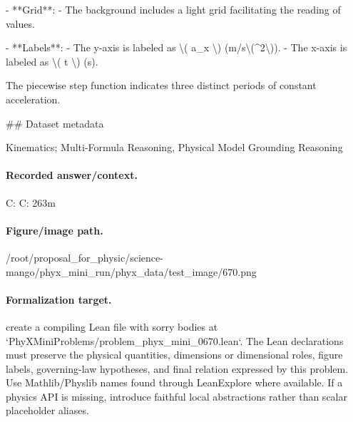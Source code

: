 - **Grid**: 
  - The background includes a light grid facilitating the reading of values.

- **Labels**: 
  - The y-axis is labeled as \textbackslash{}( a\_x \textbackslash{}) (m/s\textbackslash{}(\textasciicircum{}2\textbackslash{})).
  - The x-axis is labeled as \textbackslash{}( t \textbackslash{}) (s).

The piecewise step function indicates three distinct periods of constant acceleration.

\#\# Dataset metadata

Kinematics; Multi-Formula Reasoning, Physical Model Grounding Reasoning

\paragraph{Recorded answer/context.}
C: C: 263m

\paragraph{Figure/image path.}
/root/proposal\_for\_physic/science-mango/phyx\_mini\_run/phyx\_data/test\_image/670.png

\paragraph{Formalization target.}
create a compiling Lean file with sorry bodies at `PhyXMiniProblems/problem\_phyx\_mini\_0670.lean`. The Lean declarations must preserve the physical quantities, dimensions or dimensional roles, figure labels, governing-law hypotheses, and final relation expressed by this problem.
Use Mathlib/Physlib names found through LeanExplore where available. If a physics API is missing, introduce faithful local abstractions rather than scalar placeholder aliases.

